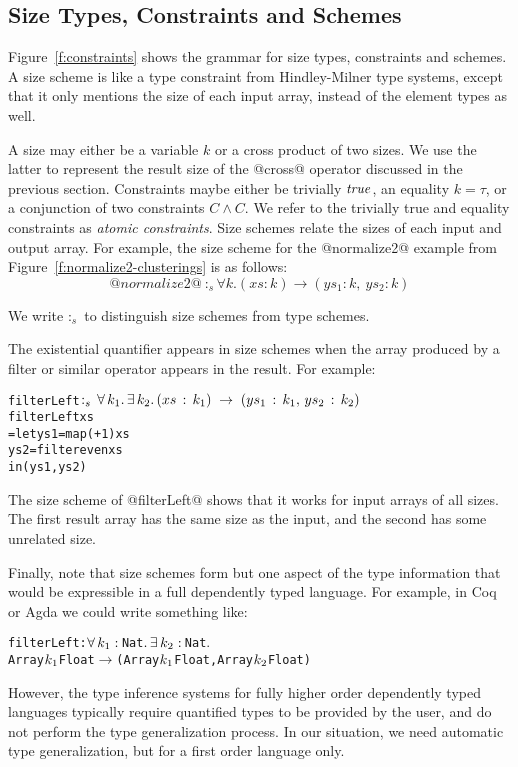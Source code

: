 \newcommand{\constr}[1]{\llbracket #1 \rrbracket}


\subsection{Size Types, Constraints and Schemes}
\label{s:SizeTypes}
Figure~\ref{f:constraints} shows the grammar for size types, constraints and schemes. A size scheme is like a type constraint from Hindley-Milner type systems, except that it only mentions the size of each input array, instead of the element types as well.

A size may either be a variable $k$ or a cross product of two sizes. We use the latter to represent the result size of the @cross@ operator discussed in the previous section. Constraints maybe either be trivially $\mathit{true}$, an equality $k = \tau$, or a conjunction of two constraints $C \wedge C$. We refer to the trivially true and equality constraints as \emph{atomic constraints}. Size schemes relate the sizes of each input and output array. For example, the size scheme for the @normalize2@ example from Figure~\ref{f:normalize2-clusterings} is as follows:
$$@normalize2@ ~:_s \forall k. (xs : k) \to (ys_1 : k,~ ys_2 : k)
$$

We write $:_s$ to distinguish size schemes from type schemes.

The existential quantifier appears in size schemes when the array produced by a filter or similar operator appears in the result. For example:
\begin{alltt}
 filterLeft \(:\sb{s}\,\forall\,k\sb{1}.\,\exists\,k\sb{2}.\,(xs\,:\,k\sb{1})\;\to\;(ys\sb{1}\,:\,k\sb{1},\,ys\sb{2}\,:\,k\sb{2})\)
 filterLeft xs
   = let ys1 = map (+ 1)   xs
         ys2 = filter even xs
     in (ys1, ys2)
\end{alltt}

The size scheme of @filterLeft@ shows that it works for input arrays of all sizes. The first result array has the same size as the input, and the second has some unrelated size.

Finally, note that size schemes form but one aspect of the type information that would be expressible in a full dependently typed language. For example, in Coq or Agda we could write something like:
\begin{alltt}
 filterLeft : \(\forall\,k\sb{1}:\,\)Nat\(.\,\exists\,k\sb{2}:\,\)Nat\(.\) 
   Array \(k\sb{1}\) Float \(\to\) (Array \(k\sb{1}\) Float, Array \(k\sb{2}\) Float)
\end{alltt}
However, the type inference systems for fully higher order dependently typed languages typically require quantified types to be provided by the user, and do not perform the type generalization process. In our situation, we need automatic type generalization, but for a first order language only.


